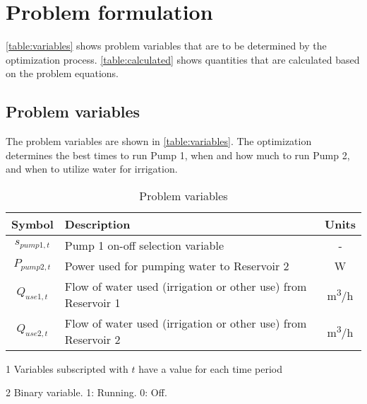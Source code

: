\section{Problem formulation}
\label{sec:problem-formulation}

\autoref{table:variables} shows problem variables that are to be determined by the optimization process.
\autoref{table:calculated} shows quantities that are calculated based on the problem equations.

\subsection{Problem variables}

The problem variables are shown in \autoref{table:variables}. The optimization determines the best times to run Pump 1, when and how much to run Pump 2, and when to utilize water for irrigation.

\begin{table}[htb]
	\begin{threeparttable}[b]
		\caption{Problem variables}
		\label{table:variables}
		\begin{tabular}{cp{}c}
			\toprule 
			Symbol & Description & Units \\
			\midrule
			$s_{pump1,t}$ & Pump 1 on-off selection variable\tnote{2} & - \\
			$P_{pump2,t}$ & Power used for pumping water to Reservoir 2 & \si{W} \\
			$Q_{use1,t}$ & Flow of water used (irrigation or other use) from Reservoir 1 & \si{m^3/h} \\
			$Q_{use2,t}$ & Flow of water used (irrigation or other use) from Reservoir 2 & \si{m^3/h} \\
			\bottomrule
		\end{tabular}
		\begin{tablenotes}
			\footnotesize
			\item [1] Variables subscripted with $t$ have a value for each time period
			\item [2] Binary variable. 1: Running. 0: Off.
		\end{tablenotes}
	\end{threeparttable}
\end{table}

